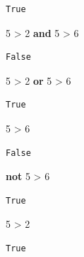 \documentclass[
  letterpaper,
  DIV=11,
  numbers=noendperiod]{scrreprt}
\newenvironment{Shaded}{\begin{snugshade}}{\end{snugshade}}
\newcommand{\DecValTok}[1]{\textcolor[rgb]{0.68,0.00,0.00}{#1}}
\newcommand{\KeywordTok}[1]{\textcolor[rgb]{0.00,0.23,0.31}{\textbf{#1}}}
\newcommand{\OperatorTok}[1]{\textcolor[rgb]{0.37,0.37,0.37}{#1}}
\begin{document}
\begin{verbatim}
True
\end{verbatim}

\begin{Shaded}
\begin{Highlighting}[]
\DecValTok{5} \OperatorTok{\textgreater{}} \DecValTok{2} \KeywordTok{and} \DecValTok{5} \OperatorTok{\textgreater{}} \DecValTok{6}
\end{Highlighting}
\end{Shaded}

\begin{verbatim}
False
\end{verbatim}

\begin{Shaded}
\begin{Highlighting}[]
\DecValTok{5} \OperatorTok{\textgreater{}} \DecValTok{2} \KeywordTok{or} \DecValTok{5} \OperatorTok{\textgreater{}} \DecValTok{6}
\end{Highlighting}
\end{Shaded}

\begin{verbatim}
True
\end{verbatim}

\begin{Shaded}
\begin{Highlighting}[]
\DecValTok{5} \OperatorTok{\textgreater{}} \DecValTok{6}
\end{Highlighting}
\end{Shaded}

\begin{verbatim}
False
\end{verbatim}

\begin{Shaded}
\begin{Highlighting}[]
\KeywordTok{not} \DecValTok{5} \OperatorTok{\textgreater{}} \DecValTok{6}
\end{Highlighting}
\end{Shaded}

\begin{verbatim}
True
\end{verbatim}

\begin{Shaded}
\begin{Highlighting}[]
\DecValTok{5} \OperatorTok{\textgreater{}} \DecValTok{2}
\end{Highlighting}
\end{Shaded}

\begin{verbatim}
True
\end{verbatim}
\end{document}

